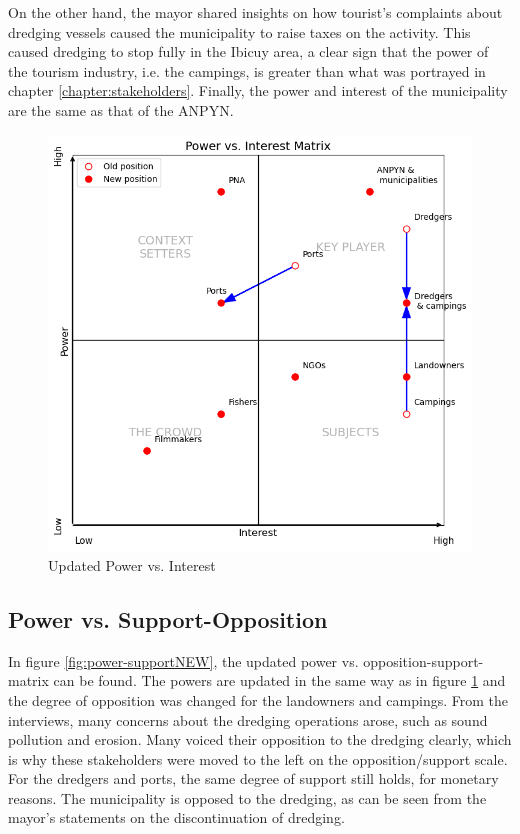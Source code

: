 On the other hand, the mayor shared insights on how tourist's complaints about dredging vessels caused the municipality to raise taxes on the activity. This caused dredging to stop fully in the Ibicuy area, a clear sign that the power of the tourism industry, i.e. the campings, is greater than what was portrayed in chapter \ref{chapter:stakeholders}. Finally, the power and interest of the municipality are the same as that of the ANPYN.

\begin{figure}[H]
    \centering
    \includegraphics[width=0.70\linewidth]{figures/ch3/NewPowerVSInterest.png}
    \caption{Updated Power vs. Interest}
    \label{fig:power-interestNEW}
\end{figure}

\subsection{Power vs. Support-Opposition}
In figure \ref{fig:power-supportNEW}, the updated power vs. opposition-support-matrix can be found. The powers are updated in the same way as in figure \ref{fig:power-interestNEW} and the degree of opposition was changed for the landowners and campings. From the interviews, many concerns about the dredging operations arose, such as sound pollution and erosion. Many voiced their opposition to the dredging clearly, which is why these stakeholders were moved to the left on the opposition/support scale. For the dredgers and ports, the same degree of support still holds, for monetary reasons. The municipality is opposed to the dredging, as can be seen from the mayor's statements on the discontinuation of dredging.

